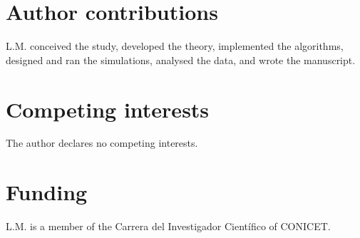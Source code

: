 \section*{Author contributions}

L.M. conceived the study, developed the theory, implemented the algorithms, designed and ran the simulations, analysed the data, and wrote the manuscript.

\section*{Competing interests}

The author declares no competing interests.

\section*{Funding}

L.M. is a member of the Carrera del Investigador Cient\'ifico of CONICET. %
